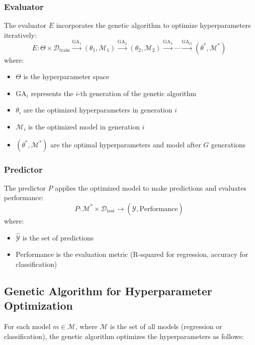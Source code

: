 \documentclass{article}
\begin{document}
\subsubsection{Evaluator}
The evaluator $E$ incorporates the genetic algorithm to optimize hyperparameters iteratively:
\begin{equation}
    E: \Theta \times \mathcal{D}_{\text{train}} \xrightarrow{\text{GA}_1} (\theta_1, \mathcal{M}_1) \xrightarrow{\text{GA}_2} (\theta_2, \mathcal{M}_2) \xrightarrow{\text{GA}_3} \cdots \xrightarrow{\text{GA}_G} (\theta^*, \mathcal{M}^*)
\end{equation}
where:
\begin{itemize}
    \item $\Theta$ is the hyperparameter space
    \item $\text{GA}_i$ represents the $i$-th generation of the genetic algorithm
    \item $\theta_i$ are the optimized hyperparameters in generation $i$
    \item $\mathcal{M}_i$ is the optimized model in generation $i$
    \item $(\theta^*, \mathcal{M}^*)$ are the optimal hyperparameters and model after $G$ generations
\end{itemize}

\subsubsection{Predictor}
The predictor $P$ applies the optimized model to make predictions and evaluates performance:
\begin{equation}
    P: \mathcal{M}^* \times \mathcal{D}_{\text{test}} \rightarrow (\hat{\mathcal{Y}}, \text{Performance})
\end{equation}
where:
\begin{itemize}
    \item $\hat{\mathcal{Y}}$ is the set of predictions
    \item Performance is the evaluation metric (R-squared for regression, accuracy for classification)
\end{itemize}

\subsection{Genetic Algorithm for Hyperparameter Optimization}

For each model $m \in \mathcal{M}$, where $\mathcal{M}$ is the set of all models (regression or classification), the genetic algorithm optimizes the hyperparameters as follows:
\end{document}
